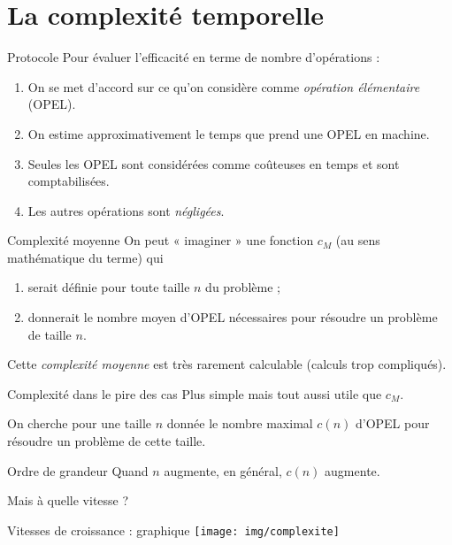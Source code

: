 \documentclass[12pt]{beamer}
\begin{document}
\section*{La complexité temporelle}
\begin{frame}{Protocole}
Pour évaluer l'efficacité en terme de nombre d'opérations :\\\pause
\begin{enumerate}[--]
	\item 	On se met d'accord sur ce qu'on considère comme \textit{opération élémentaire} (\textsc{OPEL}).\pause
    \item 	On estime approximativement le temps que prend une \textsc{OPEL} en machine.\pause
	\item 	Seules les \textsc{OPEL} sont considérées comme coûteuses en temps et sont comptabilisées.\pause
    \item   Les autres opérations sont \textit{négligées}.
\end{enumerate}
\end{frame}
\begin{frame}{Complexité moyenne}
On peut « imaginer » une fonction $c_M$ (au sens mathématique du terme) qui \pause
\begin{enumerate}[\textbullet]
	\item 	serait définie pour toute taille $n$ du problème ;\pause
	\item 	donnerait le nombre moyen d'\textsc{OPEL} nécessaires pour résoudre un problème de taille $n$.	\pause
\end{enumerate}
Cette \textit{complexité moyenne} est très rarement calculable (calculs trop compliqués).
\end{frame}

\begin{frame}{Complexité dans le pire des cas}
Plus simple mais tout aussi utile que $c_M$.\\\pause

On cherche pour une taille $n$ donnée le nombre maximal $c(n)$ d'\textsc{OPEL} pour résoudre un problème de cette taille.
\end{frame}

\begin{frame}{Ordre de grandeur}
Quand $n$ augmente, en général, $c(n)$ augmente.\\\pause

Mais à quelle vitesse ?
\end{frame}

\begin{frame}{Vitesses de croissance : graphique} %
\texttt{[image: img/complexite]}
\end{frame}
\end{document}
